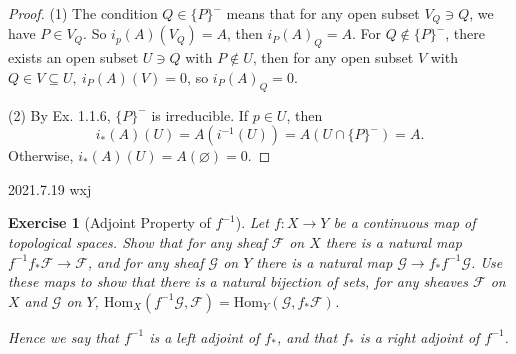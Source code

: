 \documentclass{amsart}
\newtheorem{exe}{Exercise}[subsection]
\theoremstyle{remark}\newtheorem{rmk}[theorem]{Remark}
\begin{document}
\begin{proof}
	(1) The condition $Q\in \{P\}^-$ means that for any open subset $V_Q\ni Q$, we have $P\in V_Q$. So $i_p(A)(V_Q)=A$, then $i_P(A)_Q=A$. For $Q\notin \{P\}^-$, there exists an open subset $U\ni Q$ with $P\notin U$, then for any open subset $V$ with $Q\in V\subseteq U,\ i_P(A)(V)=0$, so $i_P(A)_Q=0$.
	
	
	(2) By Ex. 1.1.6, $\{P\}^-$ is irreducible. If $p\in U$, then $$i_*(A)(U)=A(i^{-1}(U))=A(U\cap \{P\}^-)=A.$$ Otherwise, $i_*(A)(U)=A(\varnothing)=0$.
\end{proof}

2021.7.19 wxj

\begin{exe}[Adjoint Property of $f^{-1}$]
	\label{2.1.18}
   Let $f: X \rightarrow Y$ be a continuous map of topological spaces. Show that for any sheaf $\mathscr{F}$ on $X$ there is a natural map $f^{-1}f_{*}\mathscr{F} \rightarrow \mathscr{F}$, and for any sheaf $\mathscr{G}$ on $Y$ there is a natural map $\mathscr{G} \rightarrow f_{*}f^{-1}\mathscr{G}$. Use these maps to show that there is a natural bijection of sets, for any sheaves $\mathscr{F}$ on $X$ and $\mathscr{G}$ on $Y$, $\mathrm{Hom}_{X}(f^{-1}\mathscr{G}, \mathscr{F}) = \mathrm{Hom}_{Y}(\mathscr{G}, f_{*}\mathscr{F})$.
   
   Hence we say that $f^{-1}$ is a left adjoint of $f_{*}$, and that $f_{*}$ is a right adjoint of $f^{-1}$.
\end{exe}
\end{document}
